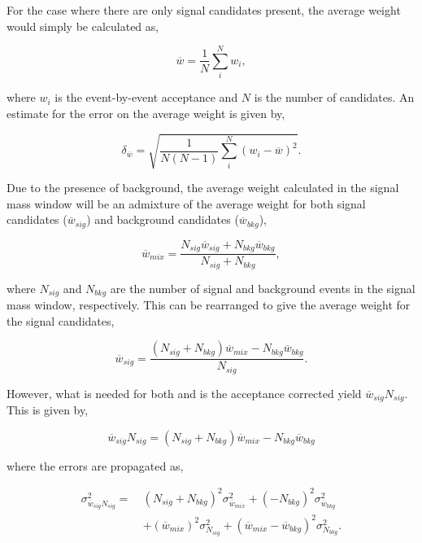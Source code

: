 For the case where there are only signal candidates present, the average weight would simply be calculated as,
 
\begin{equation}
\overline{w} = \frac{1}{N}\sum\limits_{i}^{N}w_{i},
\label{eqn:average_eff}
\end{equation}
 
\noindent where $w_{i}$ is the event-by-event acceptance and $N$ is the number of candidates.  An estimate for the error on the average weight is given by,
 
\begin{equation}
\delta_{\overline{w}} = \sqrt{\frac{1}{N(N-1)}\sum\limits_{i}^{N}(w_{i}-\overline{w})^{2}}.
\end{equation}
 
Due to the presence of background, the average weight calculated in the signal mass window will be an admixture of the average weight for both signal candidates ($\overline{w}_{sig}$) and background candidates ($\overline{w}_{bkg}$),
 
\begin{equation}
\overline{w}_{mix} = \frac{N_{sig}\overline{w}_{sig} + N_{bkg}\overline{w}_{bkg}}{N_{sig}+N_{bkg}},
\end{equation}
 
\noindent where $N_{sig}$ and $N_{bkg}$ are the number of signal and background events in the signal mass window, respectively. This can be rearranged to give the average weight for the signal candidates,
 
\begin{equation}
\overline{w}_{sig} = \frac{(N_{sig}+N_{bkg})\overline{w}_{mix} -  N_{bkg}\overline{w}_{bkg}}{N_{sig}}.
\end{equation}
 
However, what is needed for both \BdToKpimm and \BdToJPsiKst is the acceptance corrected yield $\overline{w}_{sig}N_{sig}$.  This is given by,
 
\begin{equation}
\overline{w}_{sig}N_{sig} = (N_{sig}+N_{bkg})\overline{w}_{mix} -  N_{bkg}\overline{w}_{bkg}
\end{equation}
 
\noindent where the errors are propagated as,
 
\begin{equation}
\begin{split}
\sigma_{\overline{w}_{sig}N_{sig}}^{2} =~ &(N_{sig}+N_{bkg})^{2}\sigma_{\overline{w}_{mix}}^{2} + (-N_{bkg})^{2}\sigma_{\overline{w}_{bkg}}^{2}\\
&+(\overline{w}_{mix})^{2}\sigma_{N_{sig}}^{2} + (\overline{w}_{mix}-\overline{w}_{bkg})^{2}\sigma_{N_{bkg}}^{2}.
\end{split}
\end{equation}
 
